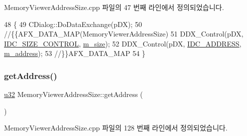 Memory\+Viewer\+Address\+Size.\+cpp 파일의 47 번째 라인에서 정의되었습니다.


\begin{DoxyCode}
48 \{
49   CDialog::DoDataExchange(pDX);
50   \textcolor{comment}{//\{\{AFX\_DATA\_MAP(MemoryViewerAddressSize)}
51   DDX\_Control(pDX, \mbox{\hyperlink{resource_8h_ae780f25b0ff893c084d3c64f36838ee5}{IDC\_SIZE\_CONTROL}}, \mbox{\hyperlink{class_memory_viewer_address_size_a02bf9c56d2fe4c0edb66f6f26323378e}{m\_size}});
52   DDX\_Control(pDX, \mbox{\hyperlink{resource_8h_af0726d27cf7b7070867a81fde283a218}{IDC\_ADDRESS}}, \mbox{\hyperlink{class_memory_viewer_address_size_a91998e945a9ebfc2dd2636f75e89d974}{m\_address}});
53   \textcolor{comment}{//\}\}AFX\_DATA\_MAP}
54 \}
\end{DoxyCode}
\mbox{\label{class_memory_viewer_address_size_a3d31492056e5b255aa882f7732671c4c}} 
\subsubsection{\texorpdfstring{get\+Address()}{getAddress()}}
{\footnotesize\ttfamily \mbox{\hyperlink{_system_8h_a10e94b422ef0c20dcdec20d31a1f5049}{u32}} Memory\+Viewer\+Address\+Size\+::get\+Address (\begin{DoxyParamCaption}{ }\end{DoxyParamCaption})}



Memory\+Viewer\+Address\+Size.\+cpp 파일의 128 번째 라인에서 정의되었습니다.


